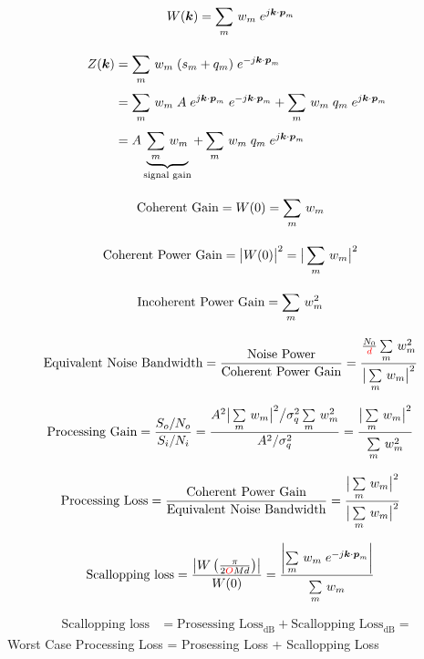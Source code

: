 \begin{align}
W(\boldsymbol{k}) &= \sum\limits_{m}^{}\, w_m\;e^{j\boldsymbol{k}\cdot\boldsymbol{p}_m}
\end{align}

\begin{align}
Z(\boldsymbol{k}) &= \sum\limits_{m}^{}\, w_m\;(s_m+q_m)\;e^{-j\boldsymbol{k}\cdot\boldsymbol{p}_m} \nonumber\\
&= \sum\limits_{m}^{}\, w_m\;A\;e^{j\boldsymbol{k}\cdot\boldsymbol{p}_m}\;e^{-j\boldsymbol{k}\cdot\boldsymbol{p}_m} + \sum\limits_{m}^{}\, w_m\;q_m\;e^{j\boldsymbol{k}\cdot\boldsymbol{p}_m} \nonumber\\
&= A \underbrace{\sum\limits_{m}^{}\, w_m}_\text{signal gain} + \sum\limits_{m}^{}\, w_m\;q_m\;e^{j\boldsymbol{k}\cdot\boldsymbol{p}_m}
\end{align}


\begin{align}
\text{Coherent Gain} &= W(0) = \sum\limits_{m}^{}\,w_m
\end{align}

\begin{align}
\text{Coherent Power Gain} &= \big|W(0)\big|^2 = \big|\sum\limits_{m}^{}\,w_m \big|^2
\end{align}

\begin{align}
\text{Incoherent Power Gain} &= \sum\limits_{m}^{}\,w_m^2
\end{align}

\begin{align}
\text{Equivalent Noise Bandwidth} &= \frac{\text{Noise Power}}{\text{Coherent Power Gain}} = \frac{\frac{N_0}{{\color{red}d}}\sum\limits_{m}^{}\,w_m^2}{\big|\sum\limits_{m}^{}\,w_m\big|^2}
\end{align}

\begin{align}
\text{Processing Gain} &= \frac{S_o/N_o}{S_i/N_i} = \frac{A^2\big|\sum\limits_{m}^{}\,w_m\big|^2 \big/ \sigma_q^2\sum\limits_{m}^{}\,w_m^2}{A^2 / \sigma_q^2} = \frac{\big|\sum\limits_{m}^{}\,w_m\big|^2}{\sum\limits_{m}^{}\,w_m^2}
\end{align}

\begin{align}
\text{Processing Loss} &= \frac{\text{Coherent Power Gain}}{\text{Equivalent Noise Bandwidth}} = \frac{\big|\sum\limits_{m}^{}\,w_m \big|^2}{\big|\sum\limits_{m}^{}\,w_m \big|^2}
\end{align}

\begin{align}
\text{Scallopping loss} &= \frac{\left|W\left(\frac{\pi}{2{\color{red}O}Md}\right)\right|}{W(0)} = \frac{\left|\sum\limits_{m}^{}\,w_m\;e^{-j\boldsymbol{k}\cdot\boldsymbol{p}_m}\right|}{\sum\limits_{m}^{}\,w_m}
\end{align}

\begin{align}
\text{Scallopping loss} &= \text{Prosessing Loss}_\text{dB} + \text{Scallopping Loss}_\text{dB} 
= 
\end{align}
Worst Case Processing Loss = Prosessing Loss + Scallopping Loss

